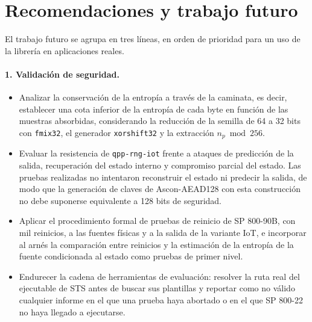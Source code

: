 \section{Recomendaciones y trabajo futuro}

El trabajo futuro se agrupa en tres líneas, en orden de prioridad para un uso de la librería en aplicaciones reales.

\paragraph{1. Validación de seguridad.}
\begin{itemize}
    \item Analizar la conservación de la entropía a través de la caminata, es decir, establecer una cota inferior de la entropía de cada byte en función de las muestras absorbidas, considerando la reducción de la semilla de 64 a 32 bits con \texttt{fmix32}, el generador \texttt{xorshift32} y la extracción $n_p \bmod 256$.
    \item Evaluar la resistencia de \texttt{qpp-rng-iot} frente a ataques de predicción de la salida, recuperación del estado interno y compromiso parcial del estado. Las pruebas realizadas no intentaron reconstruir el estado ni predecir la salida, de modo que la generación de claves de Ascon-AEAD128 con esta construcción no debe suponerse equivalente a 128 bits de seguridad.
    \item Aplicar el procedimiento formal de pruebas de reinicio de SP 800-90B, con mil reinicios, a las fuentes físicas y a la salida de la variante IoT, e incorporar al arnés la comparación entre reinicios y la estimación de la entropía de la fuente condicionada al estado como pruebas de primer nivel.
    \item Endurecer la cadena de herramientas de evaluación: resolver la ruta real del ejecutable de STS antes de buscar sus plantillas y reportar como no válido cualquier informe en el que una prueba haya abortado o en el que SP 800-22 no haya llegado a ejecutarse.
\end{itemize}

